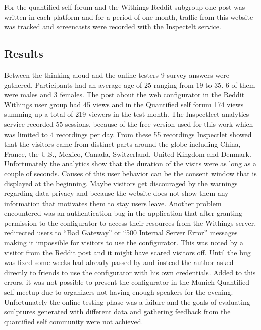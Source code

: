 \documentclass[../medieninformatik-arbeit.tex]{subfiles}
\begin{document}
For the quantified self forum and the Withings Reddit subgroup one post was written in each platform and for a period of one month, traffic from this website was tracked and screencasts were recorded with the Inspectelt service. 

\subsection{Results}
Between the thinking aloud and the online testers 9 survey answers were gathered. Participants had an average age of 25 ranging from 19 to 35. 6 of them were males and 3 females. The post about the web configurator in the Reddit Withings user group had 45 views  and in the Quantified self forum 174 views summing up a total of 219 viewers in the test month. The  Inspectlect analytics service recorded 55 sessions, because of the free version used for this work which was limited to 4 recordings per day. From these 55 recordings Inspectlet showed that the visitors came from distinct parts around the globe including China, France, the U.S., Mexico, Canada, Switzerland, United Kingdom and Denmark. Unfortunately the analytics show that the duration of the visits were as long as a couple of seconds. Causes of this user behavior can be the consent window that is displayed at the beginning. Maybe visitors get discouraged by the warnings regarding data privacy and because the website does not show them any information that motivates them to stay users leave. Another problem encountered was an authentication bug in the application that after granting permission to the configurator to access their resources from the Withings server, redirected users to ``Bad Gateway'' or ``500 Internal Server Error'' messages making it impossible for visitors to use the configurator. This was noted by a visitor from the Reddit post and it might have scared visitors off. Until the bug was fixed some weeks had already passed by and instead the author asked directly to friends to use the configurator with his own credentials. Added to this errors, it was not possible to present the configurator in the Munich Quantified self meetup due to organizers not having enough speakers for the evening. Unfortunately the online testing phase was a failure and the goals of evaluating sculptures generated with different data and gathering feedback from the quantified self community were not achieved. 
\end{document}
